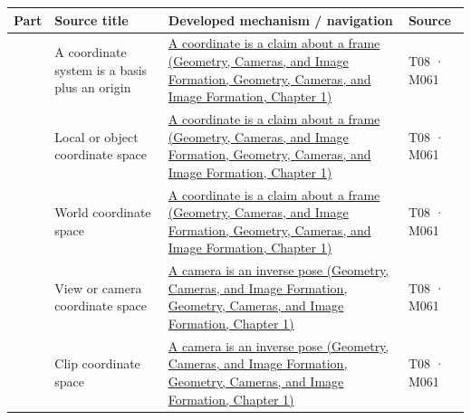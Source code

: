 {\def\LTcaptype{none} %
\begin{longtable}[]{@{}
  >{\raggedleft\arraybackslash}p{}
  >{\raggedright\arraybackslash}p{}
  >{\raggedright\arraybackslash}p{}
  >{\raggedright\arraybackslash}p{}@{}}
\toprule\noalign{}
\begin{minipage}[b]{\linewidth}\raggedleft
Part
\end{minipage} & \begin{minipage}[b]{\linewidth}\raggedright
Source title
\end{minipage} & \begin{minipage}[b]{\linewidth}\raggedright
Developed mechanism / navigation
\end{minipage} & \begin{minipage}[b]{\linewidth}\raggedright
Source
\end{minipage} \\
\midrule\noalign{}
\endhead
\bottomrule\noalign{}
\endlastfoot
1001 & A coordinate system is a basis plus an origin & \href{../03-Geometry-Cameras-and-Image-Formation/main.pdf\#nameddest=02-foundations-ii-ch032-a-coordinate-is-a-claim-about-a-frame}{A coordinate is a claim about a frame (Geometry, Cameras, and Image Formation, Geometry, Cameras, and Image Formation, Chapter 1)} & T08 · M061 \\
1002 & Local or object coordinate space & \href{../03-Geometry-Cameras-and-Image-Formation/main.pdf\#nameddest=02-foundations-ii-ch032-a-coordinate-is-a-claim-about-a-frame}{A coordinate is a claim about a frame (Geometry, Cameras, and Image Formation, Geometry, Cameras, and Image Formation, Chapter 1)} & T08 · M061 \\
1003 & World coordinate space & \href{../03-Geometry-Cameras-and-Image-Formation/main.pdf\#nameddest=02-foundations-ii-ch032-a-coordinate-is-a-claim-about-a-frame}{A coordinate is a claim about a frame (Geometry, Cameras, and Image Formation, Geometry, Cameras, and Image Formation, Chapter 1)} & T08 · M061 \\
1004 & View or camera coordinate space & \href{../03-Geometry-Cameras-and-Image-Formation/main.pdf\#nameddest=02-foundations-ii-ch032-a-camera-is-an-inverse-pose}{A camera is an inverse pose (Geometry, Cameras, and Image Formation, Geometry, Cameras, and Image Formation, Chapter 1)} & T08 · M061 \\
1005 & Clip coordinate space & \href{../03-Geometry-Cameras-and-Image-Formation/main.pdf\#nameddest=02-foundations-ii-ch032-a-camera-is-an-inverse-pose}{A camera is an inverse pose (Geometry, Cameras, and Image Formation, Geometry, Cameras, and Image Formation, Chapter 1)} & T08 · M061 \\

\end{longtable}}
